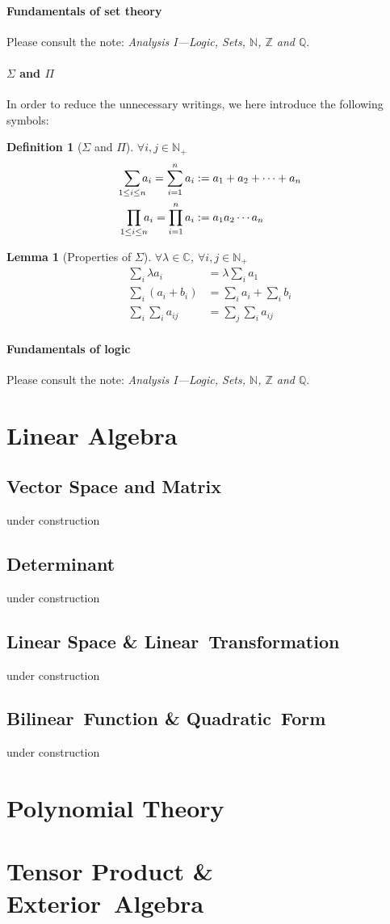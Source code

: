 \documentclass[a4paper,oneside]{book}
\newtheorem{definition}{Definition}[section]
\newtheorem{lemma}{Lemma}[section]
\begin{document}
				\subsection{Fundamentals of set theory}
					Please consult the note: \textit{Analysis I---Logic, Sets, $\mathbb{N}$, $\mathbb{Z}$ and $\mathbb{Q}$}.
				\subsection{$\Sigma$ and $\Pi$}
					In order to reduce the unnecessary writings, we here introduce the following symbols:
					\begin{definition}[$\Sigma$ and $\Pi$]
						$\forall i,j\in\mathbb{N}_+$
						\begin{align*}
							\sum_{1\leq i\leq n}\mspace{-9mu}a_i=\sum_{i=1}^{n}a_i&:=a_1+a_2+\dotsb +a_n\\
							\prod_{1\leq i\leq n}\mspace{-9mu}a_i=\prod_{i=1}^{n}a_i&:=a_1a_2\dotsm a_n
						\end{align*}
					\end{definition}
				\begin{lemma}[Properties of $\Sigma$]
					$\forall \lambda\in\mathbb{C}$, $\forall i,j\in\mathbb{N}_+$
					\begin{align*}
						\sum_{i}\lambda a_i&=\lambda\sum_{i}a_1\\
						\sum_{i}(a_i+b_i)&=\sum_{i}a_i+\sum_{i}b_i\\
						\sum_{i}\sum_{i}a_{ij}&=\sum_{j}\sum_{i}a_{ij}
					\end{align*}
				\end{lemma}
				\subsection{Fundamentals of logic}
					Please consult the note: \textit{Analysis I---Logic, Sets, $\mathbb{N}$, $\mathbb{Z}$ and $\mathbb{Q}$}.
\part{Linear Algebra}
	\chapter{Vector Space and Matrix}
	under construction
	\chapter{Determinant}
	under construction
	\chapter{Linear Space \& Linear~Transformation}
	under construction
	\chapter{Bilinear~Function \& Quadratic~Form}
	under construction
\part{Polynomial Theory}

\part{Tensor Product \& Exterior~Algebra}
\end{document}
